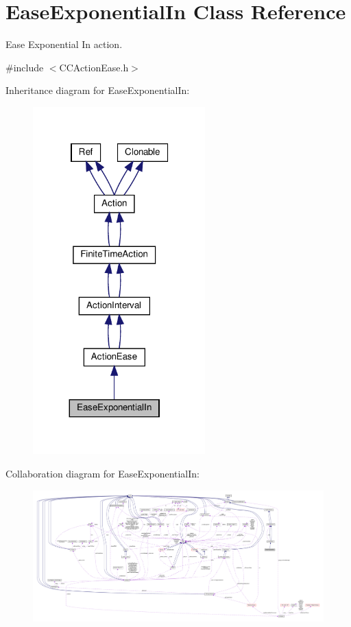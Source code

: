 \hypertarget{classEaseExponentialIn}{}\section{Ease\+Exponential\+In Class Reference}
\label{classEaseExponentialIn}


Ease Exponential In action.  




{\ttfamily \#include $<$C\+C\+Action\+Ease.\+h$>$}



Inheritance diagram for Ease\+Exponential\+In\+:
\nopagebreak
\begin{figure}[H]
\begin{center}
\leavevmode
\includegraphics[width=188pt]{classEaseExponentialIn__inherit__graph}
\end{center}
\end{figure}


Collaboration diagram for Ease\+Exponential\+In\+:
\nopagebreak
\begin{figure}[H]
\begin{center}
\leavevmode
\includegraphics[width=350pt]{classEaseExponentialIn__coll__graph}
\end{center}
\end{figure}
